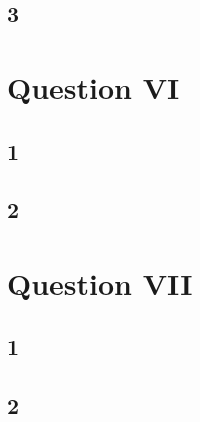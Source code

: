 \documentclass{article}
\begin{document}
\subsection{3}

\section*{Question VI}

\subsection{1}

\subsection{2}

\section*{Question VII}

\subsection{1}

\subsection{2}
\end{document}
